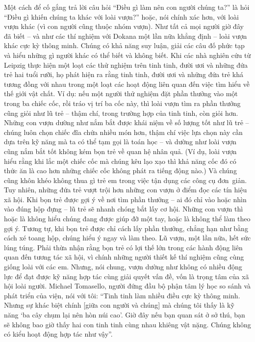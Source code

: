 \begin{multicols}{2}
	\vskip 0.1cm
	Một cách để cố gắng trả lời câu hỏi “Điều gì làm nên con người chúng ta?” là hỏi “Điều gì khiến chúng ta khác với loài vượn?” hoặc, nói chính xác hơn, với loài vượn khác (vì con người cũng thuộc nhóm vượn). Như tất cả mọi người giờ đây đã biết -- và như các thí nghiệm với Dokana một lần nữa khẳng định -- loài vượn khác cực kỳ thông minh. Chúng có khả năng suy luận, giải các câu đố phức tạp và hiểu những gì người khác có thể biết và không biết. Khi các nhà nghiên cứu từ Leipzig thực hiện một loạt các thử nghiệm trên tinh tinh, đười ươi và những đứa trẻ hai tuổi rưỡi, họ phát hiện ra rằng tinh tinh, đười ươi và những đứa trẻ khá tương đồng với nhau trong một loạt các hoạt động liên quan đến việc tìm hiểu về thế giới vật chất. Ví dụ: nếu một người thử nghiệm đặt phần thưởng vào một trong ba chiếc cốc, rồi tráo vị trí ba cốc này, thì loài vượn tìm ra phần thưởng cũng giỏi như lũ trẻ -- thậm chí, trong trường hợp của tinh tinh, còn giỏi hơn. Những con vượn dường như nắm bắt được khái niệm về số lượng tốt như lũ trẻ -- chúng luôn chọn chiếc đĩa chứa nhiều món hơn, thậm chí việc lựa chọn này cần dựa trên kỹ năng mà ta có thể tạm gọi là toán học -- và dường như loài vượn cũng nắm bắt tốt không kém bọn trẻ về quan hệ nhân quả. (Ví dụ, loài vượn hiểu rằng khi lắc một chiếc cốc mà chúng kêu lạo xạo thì khả năng cốc đó có thức ăn là cao hơn những chiếc cốc không phát ra tiếng động nào.) Và chúng cũng khôn khéo không thua gì trẻ em trong việc tận dụng các công cụ đơn~giản.
	\vskip 0.1cm
	Tuy nhiên, những đứa trẻ vượt trội hơn những con vượn ở điểm đọc các tín hiệu xã hội. Khi bọn trẻ được gợi ý về nơi tìm phần thưởng -- ai đó chỉ vào hoặc nhìn vào đúng hộp đựng -- lũ trẻ sẽ nhanh chóng bắt lấy cơ hội. Những con vượn thì hoặc là không hiểu chúng đang được giúp đỡ một tay, hoặc là không thể làm theo gợi ý. Tương tự, khi bọn trẻ được chỉ cách lấy phần thưởng, chẳng hạn như bằng cách xé toang hộp, chúng hiểu ý ngay và làm theo. Lũ vượn, một lần nữa, hết sức lúng túng. Phải thừa nhận rằng bọn trẻ có lợi thế lớn trong các hành động liên quan đến tương tác xã hội, vì chính những người thiết kế thí nghiệm cũng cùng giống loài với các em. Nhưng, nói chung, vượn dường như không có nhiều động lực để đạt được kỹ năng hợp tác cùng giải quyết vấn đề, vốn là trọng tâm của xã hội loài người.
	\vskip 0.1cm
	Michael Tomasello, người đứng đầu bộ phận tâm lý học so sánh và phát triển của viện, nói với tôi: “Tinh tinh làm nhiều điều cực kỳ thông minh. Nhưng sự khác biệt chính [giữa con người và chúng] mà chúng tôi thấy là kỹ năng ‘ba cây chụm lại nên hòn núi cao’. Giờ đây nếu bạn quan sát ở sở thú, bạn sẽ không bao giờ thấy hai con tinh tinh cùng nhau khiêng vật nặng. Chúng không có kiểu hoạt động hợp tác như vậy”.

\end{multicols}
